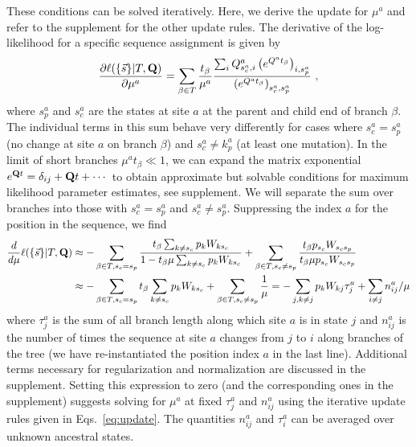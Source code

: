 \documentclass[aps,rmp,twocolumn,linenumbers]{revtex4-1}
\newcommand{\mat}[1]{{\bf #1}}
\newcommand{\eqp}{p}
\newcommand{\lh}{\ell}
\begin{document}
These conditions can be solved iteratively.
Here, we derive the update for $\mu^a$ and refer to the supplement for the other update rules.
The derivative of the log-likelihood for a specific sequence assignment is given by
\begin{equation}
	\frac{\partial \lh(\{\vec{s}\}|T,\mat{Q})}{\partial \mu^a} = \sum_{\beta\in T} \frac{t_\beta}{\mu^a}\frac{\sum_i Q^a_{s^a_c,i}\left( e^{Q^at_\beta} \right)_{i, s^a_p}}{\left( e^{Q^at_\beta} \right)_{s^a_c, s^a_p}} \ ,
\end{equation}
where $s^a_p$ and $s^a_c$ are the states at site $a$ at the parent and child end of branch $\beta$.
The individual terms in this sum behave very differently for cases where $s^a_c=s^a_p$ (no change at site $a$ on branch $\beta$) and $s^a_c\neq k^a_p$ (at least one mutation).
In the limit of short branches $\mu^a t_\beta \ll 1$, we can expand the matrix exponential $e^{\mat{Q}t}=\delta_{ij} + \mat{Q}t+\cdots$ to obtain approximate but solvable conditions for maximum likelihood parameter estimates, see supplement.
We will separate the sum over branches into those with $s^a_c=s^a_p$ and $s^a_c\neq s^a_p$.
Suppressing the index $a$ for the position in the sequence, we find
\begin{equation}
\begin{split}
	\frac{d}{d \mu} \lh (\{\vec{s}\} |T, \mat{Q}) &
	 \approx  -\sum_{\beta\in T,s_c=s_p} \frac{t_\beta \sum_{k\neq s_c} \eqp_{k} W_{k s_c}}{1 - t_\beta \mu \sum_{k\neq s_c} \eqp_k W_{ks_c}}
	 + \sum_{\beta\in T,s_c\neq s_p} \frac{t_\beta \eqp_{s_c} W_{s_cs_p}}{t_\beta \mu \eqp_{s_c} W_{s_c s_p}}\\
	 & \approx  -\sum_{\beta\in T,s_c=s_p} t_\beta \sum_{k\neq s_c} \eqp_{k} W_{k s_c} + \sum_{\beta\in T,s_c\neq s_p} \frac{1}{\mu} = - \sum_{j, k\neq j} \eqp_k W_{kj} \tau^a_j + \sum_{i\neq j} n^a_{ij}/\mu
	\end{split}
\end{equation}
where $\tau^a_j$ is the sum of all branch length along which site $a$ is in state $j$ and $n^a_{ij}$ is the number of times the sequence at site $a$ changes from $j$ to $i$ along branches of the tree (we have re-instantiated the position index $a$ in the last line).
Additional terms necessary for regularization and normalization are discussed in the supplement.
Setting this expression to zero (and the corresponding ones in the supplement) suggests solving for $\mu^a$ at fixed $\tau^a_j$ and $n^a_{ij}$ using the iterative update rules given in Eqs.~\ref{eq:update}.
The quantities $n^a_{ij}$ and $\tau^a_i$ can be averaged over unknown ancestral states.
\end{document}
